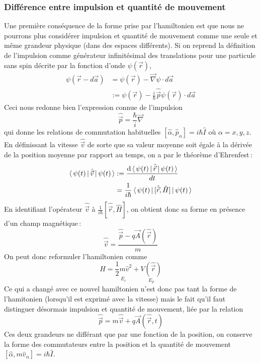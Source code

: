         \subsubsection{Différence entre impulsion et quantité de mouvement}

        Une première conséquence de la forme prise par l’hamiltonien est que nous ne pourrons plus considérer impulsion et quantité de mouvement comme une seule et même grandeur physique (dans des espaces différents). Si on reprend la définition de l’impulsion comme générateur infinitésimal des translations pour une particule sans spin décrite par la fonction d’onde $\psi(\vec{r})$, 
        \begin{align*}
            \psi(\vec{r} - d\vec{a}) 
            &= \psi(\vec{r}) - \vec{\nabla} \psi \cdot d \vec{a} \\
            &:= \psi(\vec{r}) - \frac{i}{\hbar} \hat{\vec{p}} \psi(\vec{r}) \cdot d\vec{a}
        \end{align*}
        Ceci nous redonne bien l’expression connue de l’impulsion 
        \[ \hat{\vec{p}} = \frac{\hbar}{i} \vec{\nabla} \]
        qui donne les relations de commutation habituelles $[\hat{\alpha}, \hat{p}_{\alpha}] = i\hbar\hat{I}$ où $\alpha = x,y,z$. En définissant la vitesse $\hat{\vec{v}}$ de sorte que sa valeur moyenne soit égale à la dérivée de la position moyenne par rapport au temps, on a par le théorème d’Ehrenfest :
        \begin{align*}
            \left< \, \psi(t) \, \right| \hat{\vec{v}} \left| \, \psi(t) \, \right> 
            &:= \frac{\text{d}\left< \, \psi(t) \, \right| \hat{\vec{r}} \left| \, \psi(t) \, \right>}{dt} \\
            &= \frac{1}{i\hbar} \left< \, \psi(t) \, \right| [\hat{\vec{r}}, \hat{H}] \left| \, \psi(t) \, \right>
        \end{align*}
        En identifiant l’opérateur $\hat{\vec{v}}$ à $\frac{1}{i\hbar}[\hat{\vec{r}}, \hat{H}]$, on obtient donc sa forme en présence d’un champ magnétique :
        \[ \hat{\vec{v}} = \frac{\hat{\vec{p}} - q \vec{A}(\hat{\vec{r}})}{m} \]
        On peut donc reformuler l’hamiltonien comme 
        \[ \hat{H} = \underset{E_c}{\frac{1}{2} m \hat{v}^2} + \underset{E_p}{V(\hat{\vec{r}})} \]   
        Ce qui a changé avec ce nouvel hamiltonien n’est donc pas tant la forme de l’hamitonien (lorsqu’il est exprimé avec la vitesse) mais le fait qu’il faut distinguer désormais impulsion et quantité de mouvement, liée par la relation 
        \[ \hat{\vec{p}} = m \hat{\vec{v}} + q \vec{A}(\hat{\vec{r}},t) \]  
        Ces deux grandeurs ne différant que par une fonction de la position, on conserve la forme des commutateurs entre la position et la quantité de mouvement $[\hat{\alpha}, m\hat{v}_{\alpha}] = i\hbar\hat{I}$. 

